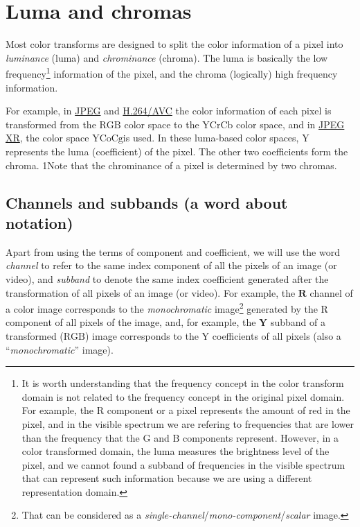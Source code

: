 \section{Luma and chromas}

Most color transforms are designed to split the color information of a
pixel into \emph{luminance} (luma) and \emph{chrominance}
(chroma). The luma is basically the low frequency\footnote{It is worth
  understanding that the frequency concept in the color transform
  domain is not related to the frequency concept in the original pixel
  domain. For example, the $\text{R}$ component or a pixel represents
  the amount of red in the pixel, and in the visible spectrum we are
  refering to frequencies that are lower than the frequency that the
  $\text{G}$ and $\text{B}$ components represent. However, in a color
  transformed domain, the luma measures the brightness level of the
  pixel, and we cannot found a subband of frequencies in the visible
  spectrum that can represent such information because we are using a
  different representation domain.} information of the pixel, and the
chroma (logically) high frequency information.

For example, in
\href{https://en.wikipedia.org/wiki/JPEG#JPEG_codec_example}{JPEG} and
\href{https://en.wikipedia.org/wiki/Advanced_Video_Coding#Fidelity_range_extensions_and_professional_profiles}{H.264/AVC}
the color information of each pixel is transformed from the
$\text{RGB}$ color space to the $\text{YCrCb}$ color space, and in
\href{https://en.wikipedia.org/wiki/JPEG_XR#Description}{JPEG XR}, the
color space $\text{YCoCg}$is used. In these luma-based color spaces,
$\text{Y}$ represents the luma (coefficient) of the pixel. The other
two coefficients form the chroma. 1Note that the chrominance of a pixel
is determined by two chromas.

\subsection*{Channels and subbands (a word about notation)}

Apart from using the terms of component and coefficient, we will use
the word \emph{channel} to refer to the same index component of all
the pixels of an image (or video), and \emph{subband} to denote the
same index coefficient generated after the transformation of all
pixels of an image (or video). For example, the $\mathbf{R}$ channel
of a color image corresponds to the \emph{monochromatic}
image\footnote{That can be considered as a
  \emph{single-channel}/\emph{mono-component}/\emph{scalar} image.}
generated by the $\text{R}$ component of all pixels of the image, and,
for example, the $\mathbf{Y}$ subband of a transformed ($\text{RGB}$)
image corresponds to the $\text{Y}$ coefficients of all pixels (also a
``\emph{monochromatic}'' image).

